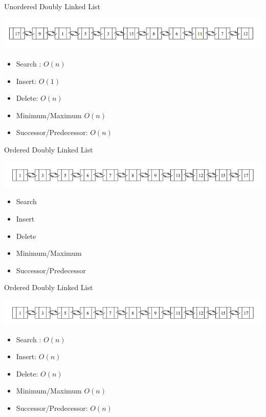 \documentclass{beamer}
\begin{document}
\begin{frame}{Unordered Doubly Linked List}
\begin{center}
    \includegraphics[scale=0.4]{linkedList.png}
\end{center}
\begin{itemize}
    \item Search : $O(n)$
    \item Insert: $O(1)$
    \item Delete: $O(n)$
    \item Minimum/Maximum $O(n)$
    \item Successor/Predecessor: $O(n)$
\end{itemize}
\end{frame}



\begin{frame}{Ordered Doubly Linked List}
\begin{center}
    \includegraphics[scale=0.4]{orderedLinkedList.png}
\end{center}
\begin{itemize}
    \item Search
    \item Insert
    \item Delete
    \item Minimum/Maximum
    \item Successor/Predecessor
\end{itemize}
\end{frame}


\begin{frame}{Ordered Doubly Linked List}
\begin{center}
    \includegraphics[scale=0.4]{orderedLinkedList.png}
\end{center}
\begin{itemize}
    \item Search : $O(n)$
    \item Insert: $O(n)$
    \item Delete: $O(n)$
    \item Minimum/Maximum $O(n)$
    \item Successor/Predecessor: $O(n)$
\end{itemize}
\end{frame}
\end{document}
